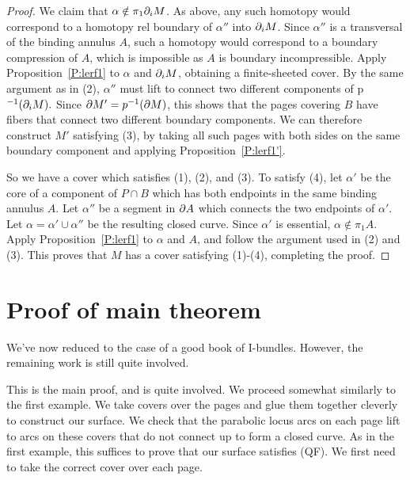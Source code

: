 \begin{proof}
We claim that $\alpha \notin \pi_1 \partial_i M$. As above, any such homotopy would
correspond to a homotopy rel boundary of $\alpha''$ into $\partial_i M$. Since
$\alpha''$ is a transversal of the binding annulus $A$, such a homotopy would
correspond to a boundary compression of $A$, which is impossible as $A$ is
boundary incompressible. Apply Proposition~\ref{P:lerf1} to $\alpha$ and $\partial_i
M$, obtaining a finite-sheeted cover. By the same argument as in (2),
$\alpha''$ must lift to connect two different components of p$^{-1}(\partial_i M).$
Since $\partial M' = p^{-1}(\partial M)$, this shows that the pages covering $B$ have
fibers that connect two different boundary components. We can therefore
construct $M'$ satisfying (3), by taking all such pages with both sides on the
same boundary component and applying Proposition~\ref{P:lerf1'}.

So we have a cover which satisfies (1), (2), and (3). To satisfy (4), let
$\alpha'$ be the core of a component of $P \cap B$ which has both endpoints in
the same binding annulus $A$. Let $\alpha''$ be a segment in $\partial A$ which
connects the two endpoints of $\alpha'$. Let $\alpha = \alpha' \cup \alpha''$
be the resulting closed curve. Since $\alpha'$ is essential, $\alpha \notin
\pi_1A$.  Apply Proposition~\ref{P:lerf1} to $\alpha$ and $A$, and follow the
argument used in (2) and (3).  This proves that $M$ has a cover satisfying
(1)-(4), completing the proof.

\end{proof}

\section{Proof of main theorem}

We've now reduced to the case of a good book of I-bundles. However, the
remaining work is still quite involved.

This is the main proof, and is quite involved. We proceed somewhat similarly to
the first example. We take covers over the pages and glue them together
cleverly to construct our surface. We check that the parabolic locus arcs on
each page lift to arcs on these covers that do not connect up to form a closed
curve. As in the first example, this suffices to prove that our surface
satisfies (QF). We first need to take the correct cover over each page.


